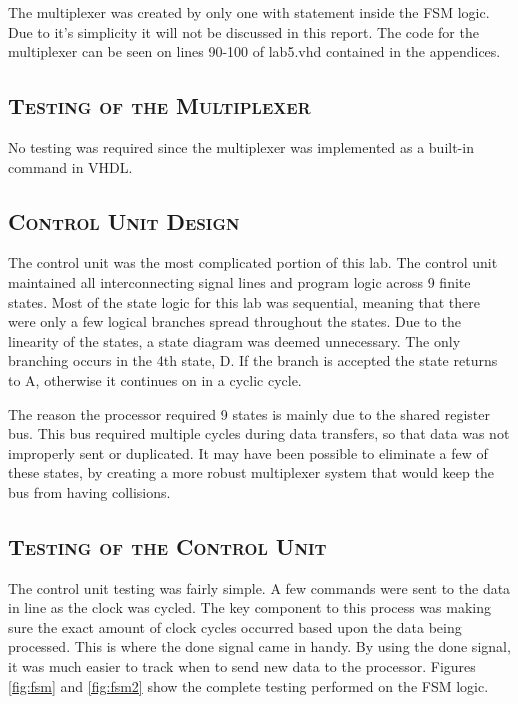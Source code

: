 \documentclass[11pt]{report}
\begin{document}
\begin{spacing}{1.5}
The multiplexer was created by only one with statement inside the FSM logic.  Due to it's simplicity it will not be discussed in this report.  The code for the multiplexer can be seen on lines 90-100 of lab5.vhd contained in the appendices.

\subsection{\scshape Testing of the Multiplexer}
\label{sub:test_piso}

No testing was required since the multiplexer was implemented as a built-in command in VHDL.

\setcounter{section}{4}
\setcounter{subsection}{0}
\subsection{\scshape Control Unit Design}
\label{sub:design_piso}

The control unit was the most complicated portion of this lab.  The control unit maintained all interconnecting signal lines and program logic across 9 finite states.  Most of the state logic for this lab was sequential, meaning that there were only a few logical branches spread throughout the states.  Due to the linearity of the states, a state diagram was deemed unnecessary.  The only branching occurs in the 4th state, D.  If the branch is accepted the state returns to A, otherwise it continues on in a cyclic cycle.

The reason the processor required 9 states is mainly due to the shared register bus.  This bus required multiple cycles during data transfers, so that data was not improperly sent or duplicated.  It may have been possible to eliminate a few of these states, by creating a more robust multiplexer system that would keep the bus from having collisions.

\subsection{\scshape Testing of the Control Unit}
\label{sub:test_piso}

The control unit testing was fairly simple.  A few commands were sent to the data in line as the clock was cycled.  The key component to this process was making sure the exact amount of clock cycles occurred based upon the data being processed.  This is where the done signal came in handy.  By using the done signal, it was much easier to track when to send new data to the processor.  Figures \ref{fig:fsm} and \ref{fig:fsm2} show the complete testing performed on the FSM logic.


\end{spacing}
\end{document}
